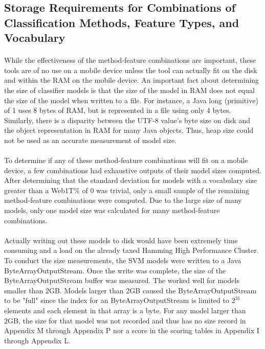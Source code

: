 \begin{singlespace}
\section{Storage Requirements for Combinations of Classification Methods, Feature Types, and Vocabulary}
\end{singlespace}
	\paragraph*{} While the effectiveness of the method-feature combinations are important, these tools are of no use on a mobile device unless the tool can actually fit on the disk and within the RAM on the mobile device.  An important fact about determining the size of classifier models is that the size of the model in RAM does not equal the size of the model when written to a file.  For instance, a Java long (primitive) of 1 uses 8 bytes of RAM, but is represented in a file using only 4 bytes.  Similarly, there is a disparity between the UTF-8 value's byte size on disk and the object representation in RAM for many Java objects.  Thus, heap size could not be used as an accurate measurement of model size.
	\paragraph*{}To determine if any of these method-feature combinations will fit on a mobile device, a few combinations had exhaustive outputs of their model sizes computed.  After determining that the standard deviation for models with a vocabulary size greater than a Web1T\% of 0 was trivial, only a small sample of the remaining method-feature combinations were computed.  Due to the large size of many models, only one model size was calculated for many method-feature combinations.  
	\paragraph*{} Actually writing out these models to disk would have been extremely time consuming and a load on the already taxed Hamming High Performance Cluster.  To conduct the size measurements, the SVM models were written to a Java ByteArrayOutputStream.  Once the write was complete, the size of the ByteArrayOutputStream buffer was measured.  The worked well for models smaller than 2GB.  Models larger than 2GB caused the ByteArrayOutputStream to be "full" since the index for an ByteArrayOutputStream is limited to $2^{31}$ elements and each element in that array is a byte.  For any model larger than 2GB, the size for that model was not recorded and thus has no size record in Appendix M through Appendix P nor a score in the scoring tables in Appendix I through Appendix L.
